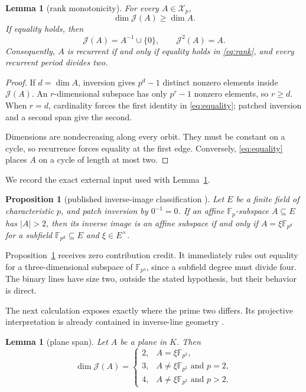 \documentclass[a4paper,10pt]{amsart}
\newtheorem{lemma}[theorem]{Lemma}
\newtheorem{proposition}[theorem]{Proposition}
\theoremstyle{remark}
\newcommand{\F}{\mathbb F}
\newcommand{\K}{K}
\newcommand{\X}{\mathcal X}
\newcommand{\J}{\mathcal J}
\begin{document}
\begin{lemma}[rank monotonicity]\label{lem:rank}
For every $A\in\X_p$,
\begin{equation}\label{eq:rank}
 \dim\J(A)\geq\dim A.
\end{equation}
If equality holds, then
\begin{equation}\label{eq:equality}
 \J(A)=A^{-1}\cup\{0\},\qquad \J^2(A)=A.
\end{equation}
Consequently, $A$ is recurrent if and only if equality holds in
\eqref{eq:rank}, and every recurrent period divides two.
\end{lemma}

\begin{proof}
If $d=\dim A$, inversion gives $p^d-1$ distinct nonzero elements inside
$\J(A)$.  An $r$-dimensional subspace has only $p^r-1$ nonzero elements, so
$r\geq d$.  When $r=d$, cardinality forces the first identity in
\eqref{eq:equality}; patched inversion and a second span give the second.

Dimensions are nondecreasing along every orbit.  They must be constant on a
cycle, so recurrence forces equality at the first edge.  Conversely,
\eqref{eq:equality} places $A$ on a cycle of length at most two.
\end{proof}

We record the exact external input used with Lemma~\ref{lem:rank}.

\begin{proposition}[published inverse-image classification
\citep{KolomeecBykov2024}]\label{prop:external}
Let $E$ be a finite field of characteristic $p$, and patch inversion by
$0^{-1}=0$.  If an affine $\F_p$-subspace $A\subseteq E$ has $|A|>2$, then
its inverse image is an affine subspace if and only if
$A=\xi\F_{p^d}$ for a subfield $\F_{p^d}\subseteq E$ and
$\xi\in E^\times$.
\end{proposition}

Proposition~\ref{prop:external} receives zero contribution credit.  It
immediately rules out equality for a three-dimensional subspace of
$\F_{p^4}$, since a subfield degree must divide four.  The binary lines have
size two, outside the stated hypothesis, but their behavior is direct.

The next calculation exposes exactly where the prime two differs.  Its
projective interpretation is already contained in inverse-line geometry
\citep{FainaEtAl2002,LavrauwZanella2014}.

\begin{lemma}[plane span]\label{lem:plane}
Let $A$ be a plane in $\K$.  Then
\begin{equation}\label{eq:plane-rank}
 \dim\J(A)=
 \begin{cases}
 2,&A=\xi\F_{p^2},\\
 3,&A\ne\xi\F_{p^2}\text{ and }p=2,\\
 4,&A\ne\xi\F_{p^2}\text{ and }p>2.
 \end{cases}
\end{equation}
\end{lemma}
\end{document}
